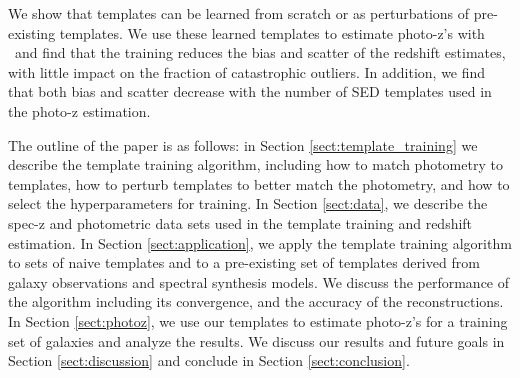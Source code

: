 We show that templates can be learned from scratch or as perturbations of pre-existing templates.
We use these learned templates to estimate photo-z's with \bpz\ and find that the training reduces the bias and scatter of the redshift estimates, with little impact on the fraction of catastrophic outliers.
In addition, we find that both bias and scatter decrease with the number of SED templates used in the photo-z estimation.

The outline of the paper is as follows:
in Section \ref{sect:template_training} we describe the template training algorithm, including how to match photometry to templates, how to perturb templates to better match the photometry, and how to select the hyperparameters for training.
In Section \ref{sect:data}, we describe the spec-z and photometric data sets used in the template training and redshift estimation.
In Section \ref{sect:application}, we apply the template training algorithm to sets of naive templates and to a pre-existing set of templates derived from galaxy observations and spectral synthesis models.
We discuss the performance of the algorithm including its convergence, and the accuracy of the reconstructions.
In Section \ref{sect:photoz}, we use our templates to estimate photo-z's for a training set of galaxies and analyze the results.
We discuss our results and future goals in Section \ref{sect:discussion} and conclude in Section \ref{sect:conclusion}.